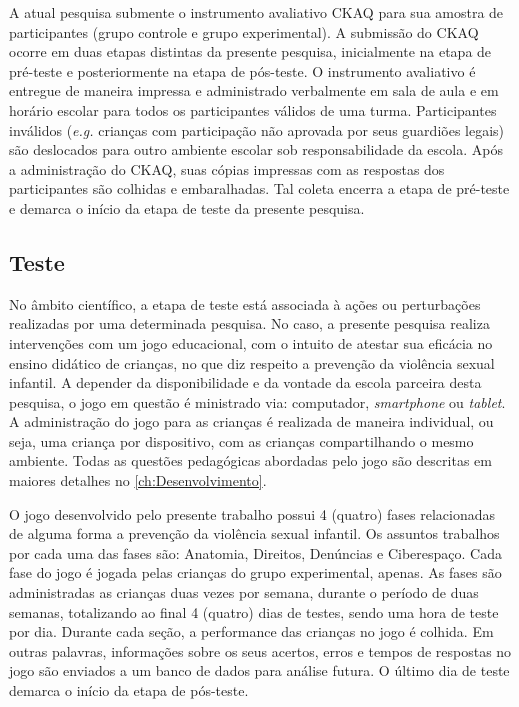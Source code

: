 A atual pesquisa submente o instrumento avaliativo \ac{CKAQ} para sua amostra de participantes (grupo controle e grupo experimental). A submissão do \ac{CKAQ} ocorre em duas etapas distintas da presente pesquisa, inicialmente na etapa de pré-teste e posteriormente na etapa de pós-teste. O instrumento avaliativo é entregue de maneira impressa e administrado verbalmente em sala de aula e em horário escolar para todos os participantes válidos de uma turma. Participantes inválidos (\textit{e.g.} crianças com participação não aprovada por seus guardiões legais) são deslocados para outro ambiente escolar sob responsabilidade da escola. Após a administração do \ac{CKAQ}, suas cópias impressas com as respostas dos participantes são colhidas e embaralhadas. Tal coleta encerra a etapa de pré-teste e demarca o início da etapa de teste da presente pesquisa.


\subsection{Teste}\label{subsec:teste}

No âmbito científico, a etapa de teste está associada à ações ou perturbações realizadas por uma determinada pesquisa. No caso, a presente pesquisa realiza intervenções com um jogo educacional, com o intuito de atestar sua eficácia no ensino didático de crianças, no que diz respeito a prevenção da violência sexual infantil. A depender da disponibilidade e da vontade da escola parceira desta pesquisa, o jogo em questão é ministrado via: computador, \textit{smartphone} ou \textit{tablet}. A administração do jogo para as crianças é realizada de maneira individual, ou seja, uma criança por dispositivo, com as crianças compartilhando o mesmo ambiente. Todas as questões pedagógicas abordadas pelo jogo são descritas em maiores detalhes no \autoref{ch:Desenvolvimento}. 

O jogo desenvolvido pelo presente trabalho possui 4 (quatro) fases relacionadas de alguma forma a prevenção da violência sexual infantil. Os assuntos trabalhos por cada uma das fases são: Anatomia, Direitos, Denúncias e Ciberespaço. Cada fase do jogo é jogada pelas crianças do grupo experimental, apenas. As fases são administradas as crianças duas vezes por semana, durante o período de duas semanas, totalizando ao final 4 (quatro) dias de testes, sendo uma hora de teste por dia. Durante cada seção, a performance das crianças no jogo é colhida. Em outras palavras, informações sobre os seus acertos, erros e tempos de respostas no jogo são enviados a um banco de dados para análise futura. O último dia de teste demarca o início da etapa de pós-teste. 

